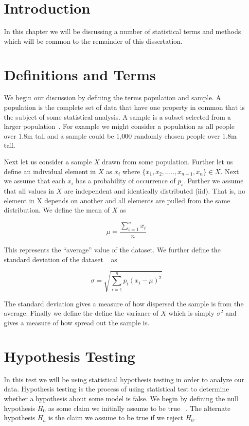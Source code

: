 \section{Introduction}
In this chapter we will be discussing a number of statistical terms and methods which will be common to the remainder of this dissertation. 

\section{Definitions and Terms}
We begin our discussion by defining the terms population and sample. A population is the complete set of data that have one property in common that is the subject of some statistical analysis. A sample is a subset selected from a larger population~\cite{devore_probability_2011}. For example we might consider a population as all people over 1.8m tall and a sample could be 1,000 randomly chosen people over 1.8m tall. 

Next let us consider a sample $X$ drawn from some population. Further let us define an individual element in $X$ as $x_i$ where $ \{x_1, x_2, ....., x_{n-1}, x_n \} \in X$. Next we assume that each $x_i$ has a probability of occurrence of $p_i$. Further we assume that all values in $X$ are independent and identically distributed (iid). That is, no element in X depends on another and all elements are pulled from the same distribution.  We define the mean of $X$ as~\cite{wackerly_mathematical_2007} 

 \begin{equation}\label{mean}
 	\mu=\frac{\sum_{i=1}^{n} x_i}{n}
 \end{equation} 

This represents the ``average'' value of the dataset. We further define the standard deviation of the dataset ~\cite{wackerly_mathematical_2007} as 

\begin{equation}\label{sigma}
	\sigma = \sqrt{\sum_{i=1}^{n}p_i(x_i-\mu)^2}
\end{equation}

The standard deviation gives a measure of how dispersed the sample is from the average. Finally we define the define the variance of $X$ which is simply $\sigma^2$ and gives a measure of how spread out the sample is. 

\section{Hypothesis Testing}
In this test we will be using statistical hypothesis testing in order to analyze our data. Hypothesis testing is the process of using statistical test to determine whether a hypothesis about some model is false. We begin by defining the null hypothesis $H_0$ as some claim we initially assume to be true ~\cite{devore_probability_2011}. The alternate hypothesis $H_a$ is the claim we assume to be true if we reject $H_0$. 

